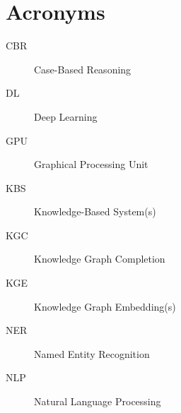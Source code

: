 

\chapter{Acronyms}
\begin{description}
\item[CBR]{Case-Based Reasoning}
\item[DL]{Deep Learning}
\item[GPU]{Graphical Processing Unit}
\item[KBS]{Knowledge-Based System(s)}
\item[KGC]{Knowledge Graph Completion}
\item[KGE]{Knowledge Graph Embedding(s)}
\item[NER]{Named Entity Recognition}
\item[NLP]{Natural Language Processing}

\end{description}





